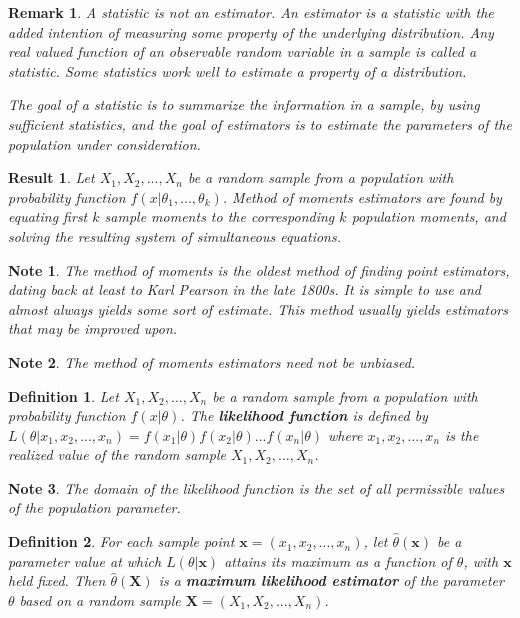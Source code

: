 \documentclass[14pt,twoside]{extreport}
\theoremstyle{dotless}
\newtheorem*{defn}{Definition}
\newtheorem*{note}{Note} %
\newtheorem*{remark}{Remark} %
\newtheorem*{result}{Result} %
\begin{document}
\begin{remark}
    A statistic is not an estimator. An estimator is a statistic with the added intention of measuring some property of the underlying distribution. 
    Any real valued function of an observable random variable in a sample is called a statistic. 
    Some statistics work well to estimate a property of a distribution.

    The goal of a statistic is to summarize the information in a sample, by using sufficient statistics, and the goal of estimators is to estimate the parameters of the population under consideration.
\end{remark}

\begin{result}
    Let $X_1, X_2, ..., X_n$ be a random sample from a population with probability function $f(x|\theta_1, ..., \theta_k)$.
    Method of moments estimators are found by equating first $k$ sample moments to the corresponding $k$ population moments, and solving the resulting system of simultaneous equations.


\end{result}

\begin{note}
    The method of moments is the oldest method of finding point estimators, dating back at least to Karl Pearson in the late 1800s. 
    It is simple to use and almost always yields some sort of estimate. This method usually yields estimators that may be improved upon.
\end{note}

\begin{note}
    The method of moments estimators need not be unbiased.
\end{note}

\begin{defn}
    Let $X_1, X_2, ..., X_n$ be a random sample from a population with probability function $f(x|\theta)$.
    The \textbf{likelihood function} is defined by $L(\theta|x_1, x_2, ..., x_n) = f(x_1|\theta) f(x_2|\theta) ... f(x_n|\theta)$ where $x_1, x_2, ..., x_n$ is the realized value of the random sample $X_1, X_2, ..., X_n$.
\end{defn}

\begin{note}
    The domain of the likelihood function is the set of all permissible values of the population parameter.
\end{note}

\begin{defn}
    For each sample point $\bm{x} = (x_1, x_2, ..., x_n)$, let $\hat{\theta}(\bm{x})$ be a parameter value at which $L(\theta|\bm{x})$ attains its maximum as a function of $\theta$, with $\bm{x}$ held fixed. Then $\hat{\theta}(\bm{X})$ is a \textbf{maximum likelihood estimator} of the parameter $\theta$ based on a random sample $\bm{X} = (X_1, X_2, ..., X_n)$.
\end{defn}
\end{document}

